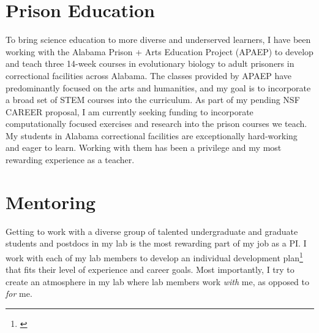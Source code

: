 \section*{Prison Education}
To bring science education to more diverse and underserved learners,
I have been working with
the Alabama Prison + Arts Education Project (APAEP) to develop and teach three
14-week courses in evolutionary biology to adult prisoners in correctional
facilities across Alabama.
The classes provided by APAEP have predominantly focused on the
arts and humanities, and
my
goal is to incorporate a broad set of STEM courses into the
curriculum.
As part of my pending NSF CAREER proposal, I am currently
seeking funding to incorporate computationally focused
exercises and research into the prison courses we teach.
My students in Alabama correctional facilities are exceptionally hard-working
and eager to learn.
Working with them has been a privilege and my most rewarding experience as a
teacher.

\section*{Mentoring}
Getting to work with a diverse group of talented undergraduate and graduate
students and postdocs in my lab is the most rewarding part of my job as a
PI.
I work with each of my lab members to develop an individual development
plan\footnote{\label{idp}} that fits
their level of experience and career goals.
Most importantly, I try to create an atmosphere in my lab where
lab members work \emph{with} me, as opposed to \emph{for} me.

